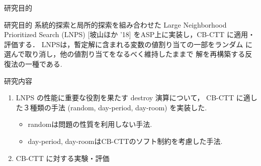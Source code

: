 \begin{frame}{研究目的}

  \begin{alertblock}{研究目的}
    系統的探索と局所的探索を組み合わせた
    \alert{Large Neighborhood Prioritized Search (LNPS)} [坡山ほか '18]
    をASP上に実装し，CB-CTT に適用・評価する．
    LNPSは，暫定解に含まれる変数の値割り当ての一部をランダム
    に選んで取り消し，他の値割り当てをなるべく維持したままで
    解を再構築する反復法の一種である.
  \end{alertblock}

  \begin{block}{研究内容}
    \begin{enumerate}
    \item LNPS の性能に重要な役割を果たす destroy 演算について，
      CB-CTT に適した３種類の手法
       (random, day-period, day-room)
      を実装した. 
      \begin{itemize}
      \item randomは問題の性質を利用しない手法.
      \item day-period, day-roomはCB-CTTのソフト制約を考慮した手法.
      \end{itemize}
    \item CB-CTT に対する実験・評価
    \end{enumerate}
  \end{block}
\end{frame}
